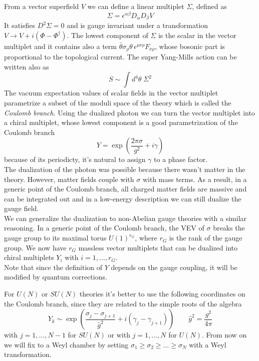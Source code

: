From a vector superfield $V$ we can define a linear multiplet $\Sigma$, defined as
\begin{equation}
 \Sigma = \epsilon^{\alpha \beta} D_{\alpha} D_{\beta} V
\end{equation}
It satisfies $D^2 \Sigma = 0$ and is gauge invariant under a transformation $V \rightarrow V + i (\Phi - \Phi^{\dagger})$.
The lowest component of $\Sigma$ is the scalar in the vector multiplet and it contains also a term $ \bar{\theta} \sigma_{\rho} \theta \, \epsilon^{\mu \nu \rho} F_{\nu \rho}$, whose bosonic part is proportional to the topological current.
The super Yang-Mills action can be written also as
\begin{equation}
S \sim \int d^4 \theta \; \Sigma^2
\end{equation}
The  vacuum expectation values of scalar fields in the vector multiplet parametrize a subset of the moduli space of the theory which is called the \emph{Coulomb branch}.
Using the dualized photon we can turn the vector multiplet into a chiral multiplet, whose lowest component is a good parametrization of the Coulomb branch 
\begin{equation}
 Y = \exp{ \left( \frac{2 \pi \sigma}{g^2} + i \gamma \right)}
\end{equation}
because of its periodicty, it's natural to assign $\gamma$ to a phase factor.\\
The dualization of the photon was possible because there wasn't matter in the theory.
However, matter fields couple with $\sigma$ with mass terms. As a result, in a generic point of the Coulomb branch, all charged matter fields are massive and can be integrated out and in a low-energy description we can still dualize the gauge field.\\
We can generalize the dualization to non-Abelian gauge theories with a similar reasoning.
In a generic point of the Coulomb branch, the VEV of $\sigma$ breaks the gauge group to its maximal torus $U(1)^{r_G}$, where $r_G$ is the rank of the gauge group. 
We now have $r_G$ massless vector multiplets that can be dualized into chiral multiplets $Y_i$ with $i=1,\dotsc,r_G$.
\\
Note that since the definition of $Y$ depends on the gauge coupling, it will be modified by quantum corrections.

For $U(N)$ or $ SU(N)$ theories it's better to use the following coordinates on the Coulomb branch, since they are related to the simple roots of the algebra
\begin{equation}
 Y_k \sim \exp \left( \frac{\sigma_j- \sigma_{j+1}}{\hat{g}^2} + i ( \gamma_j - \gamma_{j+1} )   \right) \qquad \hat{g}^2 =  \frac{g^2}{4 \pi}
\label{eqn:Y_def_sun_theories}
\end{equation}
with $j = 1, \dotsc , N -1$ for $SU(N)$ or with $ j = 1, \dotsc, N$ for $U(N)$.
From now on we will fix to a Weyl chamber by setting $\sigma_1 \geq \sigma_2 \geq \dots \geq \sigma_N$ with a Weyl transformation.














